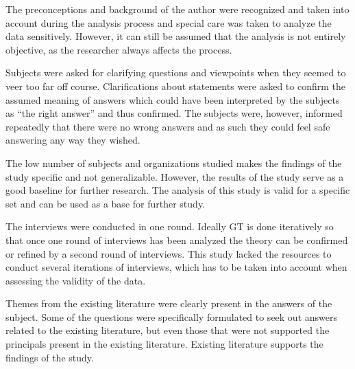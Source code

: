 The preconceptions and background of the author were recognized and taken into account during the analysis process and special care was taken to analyze the data sensitively. However, it can still be assumed that the analysis is not entirely objective, as the researcher always affects the process.

Subjects were asked for clarifying questions and viewpoints when they seemed to veer too far off course. Clarifications about statements were asked to confirm the assumed meaning of answers which could have been interpreted by the subjects as ``the right answer'' and thus confirmed. The subjects were, however, informed repeatedly that there were no wrong answers and as such they could feel safe answering any way they wished. 




The low number of subjects and organizations studied makes the findings of the study specific and not generalizable. However, the results of the study serve as a good baseline for further research. The analysis of this study is valid for a specific set and can be used as a base for further study.

The interviews were conducted in one round. Ideally GT is done iteratively so that once one round of interviews has been analyzed the theory can be confirmed or refined by a second round of interviews. This study lacked the resources to conduct several iterations of interviews, which has to be taken into account when assessing the validity of the data.

Themes from the existing literature were clearly present in the answers of the subject. Some of the questions were specifically formulated to seek out answers related to the existing literature, but even those that were not supported the principals present in the existing literature. Existing literature supports the findings of the study.

